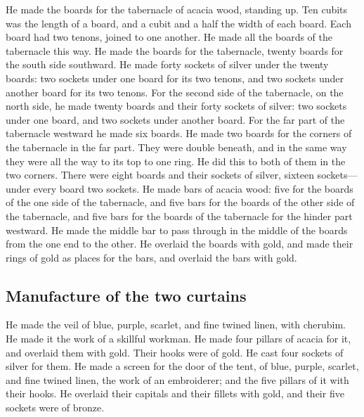  He made the boards for the tabernacle of acacia wood,
standing up.  Ten cubits was the length of a board, and a
cubit and a half the width of each board.  Each board had
two tenons, joined to one another. He made all the boards of the
tabernacle this way.  He made the boards for the
tabernacle, twenty boards for the south side southward. 
He made forty sockets of silver under the twenty boards: two sockets
under one board for its two tenons, and two sockets under another board
for its two tenons.  For the second side of the
tabernacle, on the north side, he made twenty boards  and
their forty sockets of silver: two sockets under one board, and two
sockets under another board.  For the far part of the
tabernacle westward he made six boards.  He made two
boards for the corners of the tabernacle in the far part.
 They were double beneath, and in the same way they were
all the way to its top to one ring. He did this to both of them in the
two corners.  There were eight boards and their sockets
of silver, sixteen sockets---under every board two sockets.
 He made bars of acacia wood: five for the boards of the
one side of the tabernacle,  and five bars for the boards
of the other side of the tabernacle, and five bars for the boards of the
tabernacle for the hinder part westward.  He made the
middle bar to pass through in the middle of the boards from the one end
to the other.  He overlaid the boards with gold, and made
their rings of gold as places for the bars, and overlaid the bars with
gold.

\hypertarget{manufacture-of-the-two-curtains}{%
\subsection{Manufacture of the two
curtains}\label{manufacture-of-the-two-curtains}}

 He made the veil of blue, purple, scarlet, and fine
twined linen, with cherubim. He made it the work of a skillful workman.
 He made four pillars of acacia for it, and overlaid them
with gold. Their hooks were of gold. He cast four sockets of silver for
them.  He made a screen for the door of the tent, of
blue, purple, scarlet, and fine twined linen, the work of an
embroiderer;  and the five pillars of it with their
hooks. He overlaid their capitals and their fillets with gold, and their
five sockets were of bronze.


